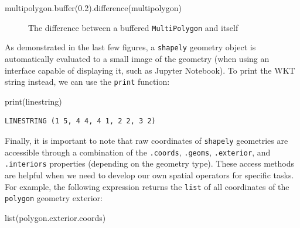 \documentclass[
  letterpaper,
]{krantz}
\newenvironment{Shaded}{\begin{snugshade}}{\end{snugshade}}
\newcommand{\BuiltInTok}[1]{\textcolor[rgb]{0.00,0.23,0.31}{#1}}
\newcommand{\FloatTok}[1]{\textcolor[rgb]{0.68,0.00,0.00}{#1}}
\newcommand{\NormalTok}[1]{\textcolor[rgb]{0.00,0.23,0.31}{#1}}
\begin{document}
\begin{Shaded}
\begin{Highlighting}[]
\NormalTok{multipolygon.}\BuiltInTok{buffer}\NormalTok{(}\FloatTok{0.2}\NormalTok{).difference(multipolygon)}
\end{Highlighting}
\end{Shaded}

\begin{figure}[H]


\caption{\label{fig-mpol-buffer-difference}The difference between a
buffered \texttt{MultiPolygon} and itself}

\end{figure}%

As demonstrated in the last few figures, a \texttt{shapely} geometry
object is automatically evaluated to a small image of the geometry (when
using an interface capable of displaying it, such as Jupyter Notebook).
To print the WKT string instead, we can use the \texttt{print} function:

\begin{Shaded}
\begin{Highlighting}[]
\BuiltInTok{print}\NormalTok{(linestring)}
\end{Highlighting}
\end{Shaded}

\begin{verbatim}
LINESTRING (1 5, 4 4, 4 1, 2 2, 3 2)
\end{verbatim}

Finally, it is important to note that raw coordinates of
\texttt{shapely} geometries are accessible through a combination of the
\texttt{.coords}, \texttt{.geoms}, \texttt{.exterior}, and
\texttt{.interiors} properties (depending on the geometry type). These
access methods are helpful when we need to develop our own spatial
operators for specific tasks. For example, the following expression
returns the \texttt{list} of all coordinates of the \texttt{polygon}
geometry exterior:

\begin{Shaded}
\begin{Highlighting}[]
\BuiltInTok{list}\NormalTok{(polygon.exterior.coords)}
\end{Highlighting}
\end{Shaded}
\end{document}
